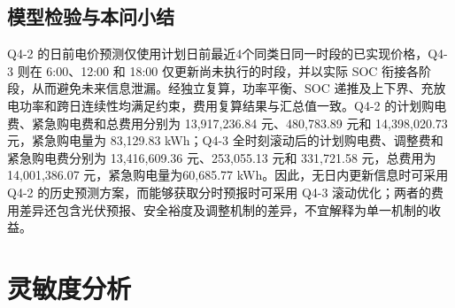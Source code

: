\documentclass[withoutpreface,bwprint]{cumcmthesis}
\begin{document}
\subsection{模型检验与本问小结}

Q4-2 的日前电价预测仅使用计划日前最近4个同类日同一时段的已实现价格，Q4-3 则在 6:00、12:00 和 18:00 仅更新尚未执行的时段，并以实际 SOC 衔接各阶段，从而避免未来信息泄漏。经独立复算，功率平衡、SOC 递推及上下界、充放电功率和跨日连续性均满足约束，费用复算结果与汇总值一致。Q4-2 的计划购电费、紧急购电费和总费用分别为 13,917,236.84 元、480,783.89 元和 14,398,020.73 元，紧急购电量为 83,129.83 kWh；Q4-3 全时刻滚动后的计划购电费、调整费和紧急购电费分别为 13,416,609.36 元、253,055.13 元和 331,721.58 元，总费用为 14,001,386.07 元，紧急购电量为60,685.77 kWh。因此，无日内更新信息时可采用 Q4-2 的历史预测方案，而能够获取分时预报时可采用 Q4-3 滚动优化；两者的费用差异还包含光伏预报、安全裕度及调整机制的差异，不宜解释为单一机制的收益。
\section{灵敏度分析}
\end{document}

